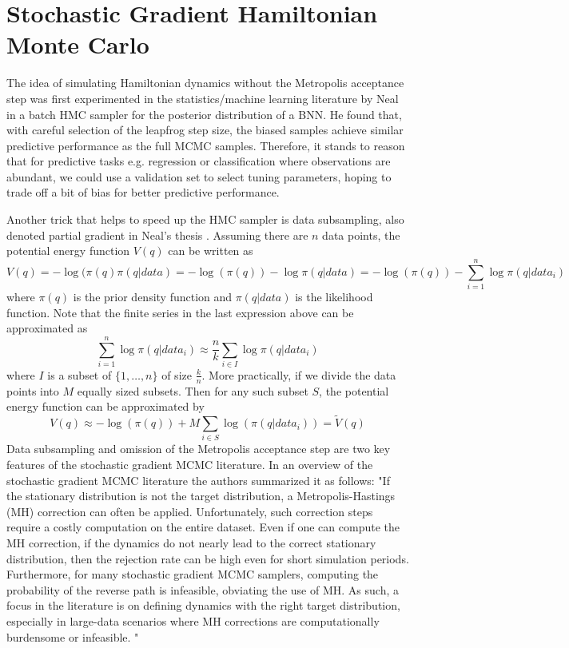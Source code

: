 \documentclass[12pt]{report}
\begin{document}
\section{Stochastic Gradient Hamiltonian Monte Carlo}
The idea of simulating Hamiltonian dynamics without the Metropolis acceptance step was first experimented in the statistics/machine learning literature by Neal \cite{neal2012bayesian} in a batch HMC sampler for the posterior distribution of a BNN. He found that, with careful selection of the leapfrog step size, the biased samples achieve similar predictive performance as the full MCMC samples. Therefore, it stands to reason that for predictive tasks e.g. regression or classification where observations are abundant, we could 
use a validation set to select tuning parameters, hoping to trade off a bit of bias for better predictive performance. 

Another trick that helps to speed up the HMC sampler is data subsampling, also denoted partial gradient in Neal's thesis \cite{neal2012bayesian}.
Assuming there are $n$ data points, the potential energy function $V(q)$ can be written as 
\[ V(q) = -\log( \pi(q) \pi(q|data) = -\log(\pi(q)) -\log \pi(q|data) = -\log(\pi(q)) - \sum_{i=1}^n \log \pi(q|data_i) \]
where $\pi(q)$ is the prior density function and $\pi(q|data)$ is the likelihood function. Note that the finite series in the last expression above can be approximated as 
\[ \sum_{i=1}^n \log \pi(q|data_i) \approx \frac{n}{k} \sum_{i \in I} \log \pi(q|data_i) \]
where $I$ is a subset of $\{1,\dots, n\}$ of size $\frac{k}{n}$. 
More practically, if we divide the data points into $M$ equally sized subsets. Then for any such subset $S$, the potential energy function can be approximated by 
\[ V(q) \approx    -\log(\pi(q)) + M \sum_{i \in S} \log(\pi(q|data_i)) = \tilde{V}(q) \] Data subsampling and omission of the Metropolis acceptance step are two key features of the stochastic gradient MCMC literature. In an overview of the stochastic gradient MCMC literature \cite{ma2015complete}
the authors summarized it as follows:
 "If the stationary distribution is not the target distribution, a Metropolis-Hastings (MH) correction can often be applied. Unfortunately, such correction steps require a costly computation on the entire
dataset. Even if one can compute the MH correction, if the dynamics do not nearly lead to the correct stationary distribution, then the rejection rate can be high even for short simulation periods. Furthermore, for many stochastic gradient MCMC samplers, computing the probability of the reverse path is infeasible, obviating the use of MH. As such, a focus in the literature is on defining dynamics with the right target distribution, especially in large-data scenarios where MH corrections are computationally burdensome or infeasible.
"
\end{document}

